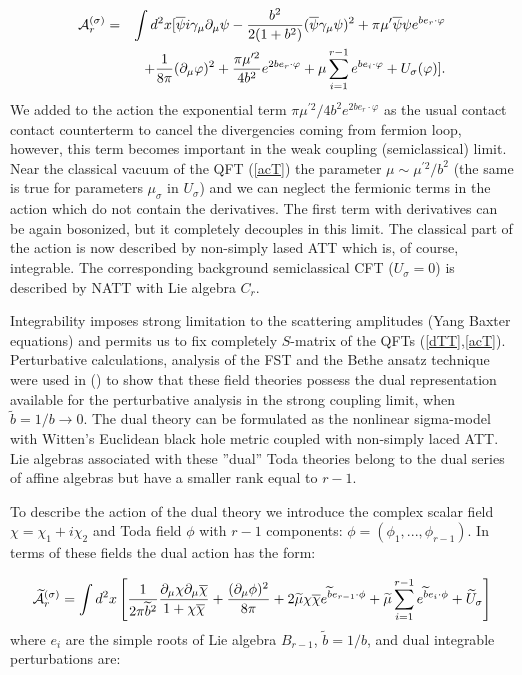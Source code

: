 \documentclass[a4paper,12pt]{article}
\begin{document}
\begin{eqnarray}
{\cal A}_r^{(\sigma )}&=&\int d^2x[\overline{\psi }i\gamma _\mu \partial
_\mu \psi -\frac{b^2}{2(1+b^2)}(\overline{\psi }\gamma _\mu \psi )^2+\pi \mu
^{\prime }\overline{\psi }\psi e^{be_r\cdot \varphi }
\nonumber \\
&&
+\frac 1{8\pi }(\partial _\mu \varphi )^2+\frac{\pi \mu ^{\prime 2}}{4b^2}
e^{2be_r\cdot \varphi }+\mu \sum\limits_{i=1}^{r-1}e^{be_i\cdot \varphi
}+U_\sigma (\varphi )]. \label{acT} 
\end{eqnarray}
We added to the action the exponential term $\pi \mu ^{\prime
2}/4b^2e^{2be_r\cdot \varphi }$ as the usual contact contact counterterm to
cancel the divergencies coming from fermion loop, however, this term becomes
important in the weak coupling (semiclassical) limit. Near the classical 
vacuum of the QFT (\ref{acT})  the parameter $\mu \sim \mu
^{\prime 2}/b^2$ (the same is true for parameters $\mu _\sigma $ in 
$U_\sigma $) and we can neglect the fermionic terms in the action 
which do not contain the
derivatives. The first term with derivatives can be again bosonized, but it
completely decouples in this limit. The classical part of the action is now
described by non-simply lased ATT which is, of course, integrable. The
corresponding background semiclassical CFT ($U_\sigma =0$) is described by
NATT with Lie algebra $C_r$.

Integrability imposes strong limitation to the scattering amplitudes (Yang
Baxter equations) and permits us to fix completely $S$-matrix of the 
QFTs (\ref{dTT},\ref{acT}). 
Perturbative calculations, analysis of the FST and the Bethe
ansatz technique were used in (\cite{FA}) to show that these field theories
possess the dual representation available for the perturbative analysis in
the strong coupling limit, when $\widetilde{b}=1/b\rightarrow 0$. The dual
theory can be formulated as the nonlinear sigma-model with Witten's
Euclidean black hole metric coupled with non-simply laced ATT. Lie algebras
associated with these ''dual'' Toda theories belong to the dual series of
affine algebras but have a smaller rank equal to $r-1$.

To describe the action of the dual theory we introduce the complex scalar
field $\chi =\chi _1+i\chi _2$ and Toda field $\phi $ with $r-1$ components: 
$\phi =\left( \phi _1,...,\phi _{r-1}\right) $. In terms of these fields the
dual action has the form:

\begin{equation}
\widetilde{{\cal A}}_r^{\left( \sigma \right) }=\int d^2x\left[ \frac 1{2\pi 
\widetilde{b}^2}\frac{\partial _\mu \chi \partial _\mu \overline{\chi }}
{1+\chi \overline{\chi }}+\frac{(\partial _\mu \phi )^2}{8\pi }+2\widetilde
{\mu }\chi \overline{\chi }e^{\widetilde{b}e_{r-1}\cdot\phi }
+\widetilde{\mu }
\sum\limits_{i=1}^{r-1}e^{\widetilde{b}e_i\cdot\phi }+
\widetilde{U}_\sigma \right]
\label{Adu}
\end{equation}
where $e_i$ are the simple roots of Lie algebra $B_{r-1}$, $\widetilde{b}
=1/b $, and dual integrable perturbations are:
\end{document}
